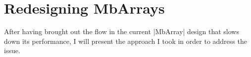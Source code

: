 \section{Redesigning MbArrays}
\label{sec:redesign}

After having brought out the flow in the current |MbArray| design that slows down its performance, I will present the approach I took in order to address the issue.
 